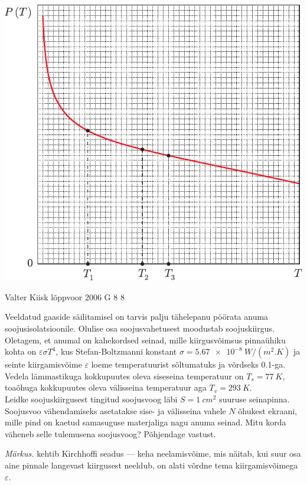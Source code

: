 \documentclass[11pt, twoside]{article}
\begin{document}
{{\begin{center}
	\includegraphics[width=0.8\linewidth]{2007-v3g-07-yl}
\end{center}
\fi
}

{Valter Kiisk} %
{lõppvoor} %
{2006} %
{G 8} %
{8} %
{
\ifStatement
Veeldatud gaaside säilitamisel on tarvis palju tähelepanu pöörata anuma soojusisolatsioonile. Olulise osa soojusvahetusest moodustab soojuskiirgus. Oletagem, et anumal on kahekordsed seinad, mille kiirgusvõimsus pinnaühiku kohta on $\varepsilon \sigma T^4$, kus Stefan-Boltzmanni konstant $\sigma = \SI{5,67e-8}{W/(m^2.K)}$ ja seinte kiirgamisvõime $\varepsilon$ loeme temperatuurist sõltumatuks ja võrdseks \num{0,1}-ga. Vedela lämmastikuga kokkupuutes oleva siseseina temperatuur on $T_s = \SI{77}{K}$, toaõhuga kokkupuutes oleva välisseina temperatuur aga $T_v = \SI{293}{K}$.\\
\osa Leidke soojuskiirgusest tingitud soojusvoog läbi $S = \SI{1}{cm^2}$ suuruse seinapinna.\\
\osa Soojusvoo vähendamiseks asetatakse sise- ja välisseina vahele $N$ õhukest ekraani, mille pind on kaetud samasuguse materjaliga nagu anuma seinad. Mitu korda väheneb selle tulemusena soojusvoog? Põhjendage vastust.

\emph{Märkus.} kehtib Kirchhoffi seadus --- keha neelamisvõime, mis näitab, kui suur osa aine pinnale langevast kiirgusest neeldub, on alati võrdne tema kiirgamisvõimega $\varepsilon$.\\
\fi
}

}
\end{document}
